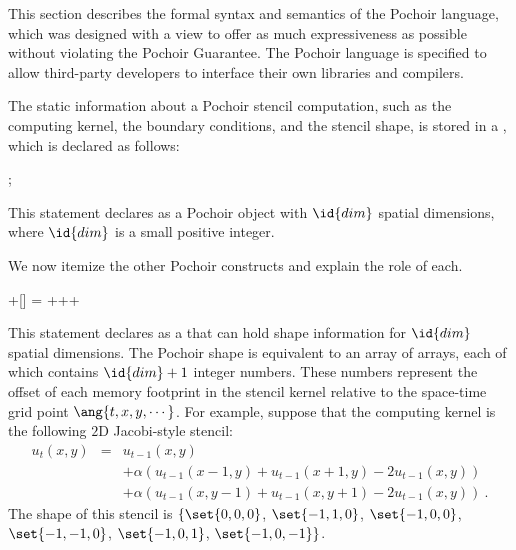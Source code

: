 

This section describes the formal syntax and semantics of the Pochoir
language, which was designed with a view to offer as much
expressiveness as possible without violating the Pochoir Guarantee.
The Pochoir language is specified to allow third-party developers to
interface their own libraries and compilers.

The static information about a Pochoir stencil computation, such as
the computing kernel, the boundary conditions, and the stencil shape,
is stored in a , which is declared as follows:
\begin{closeitemize} 
\lstset{language=Pochoir_bf}
\item {} ;
\end{closeitemize}
This statement declares  as a Pochoir object with $\id{dim}$
spatial dimensions, where $\id{dim}$ is a small positive integer.

We now itemize the other Pochoir constructs and explain the role of
each.

\begin{closeitemize}
\lstset{language=Pochoir_bf}
\item {}  \code+[] = {+\code+}+
\end{closeitemize}
This statement declares  as a  that can
hold shape information for $\id{dim}$ spatial dimensions.  The Pochoir
shape is equivalent to an array of arrays, each of which contains
$\id{dim} + 1$ integer numbers.  These numbers represent the offset of
each memory footprint in the stencil kernel relative to the space-time
grid point $\ang{t, x, y, \cdots}$.  For example, suppose that the
computing kernel is the following $2$D Jacobi-style stencil:
\begin{eqnarray*}
  u_{t}(x,y) & = & u_{t-1}(x,y) \nonumber\\
   & & + \alpha (u_{t-1}(x-1,y) + u_{t-1}(x+1,y) - 2 u_{t-1}(x,y))\nonumber \\
   & & + \alpha (u_{t-1}(x,y-1) + u_{t-1}(x,y+1) - 2u_{t-1}(x,y))\ .
\end{eqnarray*}
The shape of this stencil is $\{\set{0, 0, 0}$,
  $\set{-1, 1, 0}$, $\set{-1, 0, 0}$, $\set{-1,
    -1, 0}$, $\set{-1, 0, 1}$, $\set{-1, 0,
    -1}\}$.
  
